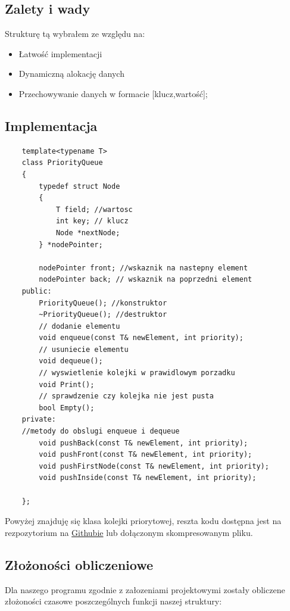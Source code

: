 \documentclass{article}
\begin{document}
\subsection{Zalety i wady}
Strukturę tą wybrałem ze względu na:
\begin{itemize}
    \item Łatwość implementacji
    \item Dynamiczną alokację danych
    \item Przechowywanie danych w formacie [klucz,wartość];
\end{itemize}


\subsection{Implementacja}

\begin{lstlisting}
    template<typename T>
    class PriorityQueue
    {
        typedef struct Node
        {
            T field; //wartosc 
            int key; // klucz
            Node *nextNode; 
        } *nodePointer;
    
        nodePointer front; //wskaznik na nastepny element
        nodePointer back; // wskaznik na poprzedni element
    public:
        PriorityQueue(); //konstruktor
        ~PriorityQueue(); //destruktor
        // dodanie elementu
        void enqueue(const T& newElement, int priority); 
        // usuniecie elementu
        void dequeue(); 
        // wyswietlenie kolejki w prawidlowym porzadku
        void Print(); 
        // sprawdzenie czy kolejka nie jest pusta
        bool Empty(); 
    private:
    //metody do obslugi enqueue i dequeue
        void pushBack(const T& newElement, int priority); 
        void pushFront(const T& newElement, int priority);
        void pushFirstNode(const T& newElement, int priority);
        void pushInside(const T& newElement, int priority);
        
    };
    \end{lstlisting}
    
Powyżej znajduję się klasa kolejki priorytowej, reszta kodu dostępna jest na 
rezpozytorium na \href{https://github.com/Damiry0/PAMSI}{Githubie} lub dołączonym skompresowanym pliku.
\newpage
\subsection{Złożoności obliczeniowe}
Dla naszego programu zgodnie z załozeniami projektowymi zostały obliczene złożoności czasowe poszczególnych 
funkcji naszej struktury:
\end{document}
